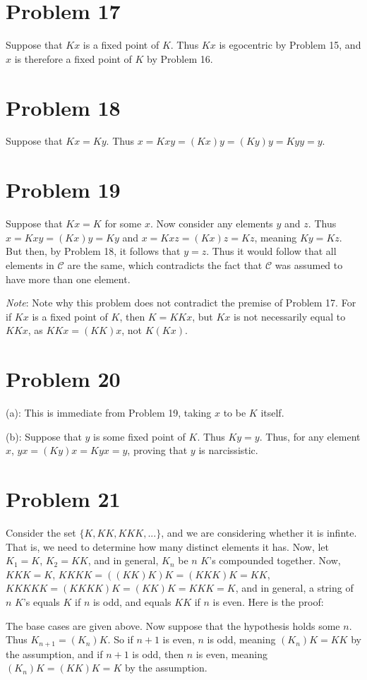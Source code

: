 \documentclass{article}
\theoremstyle{definition}
\begin{document}
\section*{Problem 17}
Suppose that $Kx$ is a fixed point of $K$. Thus $Kx$ is egocentric by Problem 15, and $x$ is therefore a fixed point of $K$ by Problem 16.

\section*{Problem 18}
Suppose that $Kx=Ky$. Thus $x=Kxy=(Kx)y=(Ky)y=Kyy=y$.

\section*{Problem 19}
Suppose that $Kx=K$ for some $x$. Now consider any elements $y$ and $z$. Thus $x=Kxy=(Kx)y=Ky$ and $x=Kxz=(Kx)z=Kz$, meaning $Ky=Kz$. But then, by Problem 18, it follows that 
$y=z$. Thus it would follow that all elements in $\mathcal{C}$ are the same, which contradicts the fact that $\mathcal{C}$ was assumed to have more than one element. 

\textit{Note}: Note why this problem does not contradict the premise of Problem 17. For if $Kx$ is a fixed point of $K$, then $K=KKx$, but $Kx$ is not necessarily equal to $KKx$, as 
$KKx=(KK)x$, not $K(Kx)$. 

\section*{Problem 20}
(a): This is immediate from Problem 19, taking $x$ to be $K$ itself.


(b): Suppose that $y$ is some fixed point of $K$. Thus $Ky=y$. Thus, for any element $x$, $yx=(Ky)x=Kyx=y$, proving that $y$ is narcissistic.

\section*{Problem 21}
Consider the set $\{K,KK,KKK,...\}$, and we are considering whether it is infinte. That is, we need to determine how many distinct elements it has. Now, let $K_1=K$, $K_2=KK$, and in general, 
$K_n$ be $n$ $K$'s compounded together. Now, $KKK=K$, $KKKK=((KK)K)K=(KKK)K=KK$, $KKKKK=(KKKK)K=(KK)K=KKK=K$, and in general, a string of $n$ $K$'s equals $K$ if $n$ is odd, 
and equals $KK$ if $n$ is even. Here is the proof:


The base cases are given above. Now suppose that the hypothesis holds some $n$. Thus $K_{n+1}=(K_n)K$. So if $n+1$ is even, $n$ is odd, meaning $(K_n)K=KK$ by the assumption, and if 
$n+1$ is odd, then $n$ is even, meaning $(K_n)K=(KK)K=K$ by the assumption.
\end{document}
